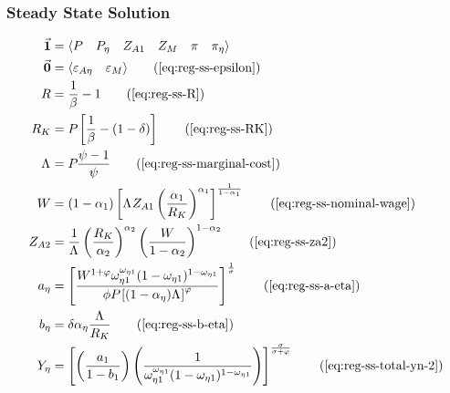 \documentclass[
thesis.tex
]{subfiles}
\begin{document}

	
	
	\subsubsection{Steady State Solution}
	
	\vspace*{-1cm}

	\begin{align}
		\vec{\bm{1}} &= \langle \begin{matrix} P & P_{\eta} & Z_{A1} & Z_{M} & \pi & \pi_{\eta} \end{matrix} \rangle \label{eq:reg-unity-vector}
		\\
		\vec{\bm{0}} &= \langle \begin{matrix} \varepsilon_{A\eta} & \varepsilon_{M} \end{matrix} \rangle \tag{\ref{eq:reg-ss-epsilon}}
		\\
		R &= \frac{1}{\beta} - 1 \tag{\ref{eq:reg-ss-R}}
		\\
		R_K &= P_{} \left[ \frac{1}{\beta} - (1-\delta) \right] \tag{\ref{eq:reg-ss-RK}}
		\\
		\Lambda_{} &= P_{} \frac{\psi-1}{\psi} \tag{\ref{eq:reg-ss-marginal-cost}}
		\\
		W &= (1-{\alpha_{1}}) \left[ \Lambda_{} Z_{A1} \left( \frac{{\alpha_{1}}}{R_K} \right)^{{\alpha_{1}}} \right]^\frac{1}{1-{\alpha_{1}}} \tag{\ref{eq:reg-ss-nominal-wage}}
		\\
		Z_{A2} &= \frac{1}{\Lambda_{}} \left( \frac{R_K}{{\alpha_{2}}} \right)^{{\alpha_{2}}} \left( \frac{W}{1-{\alpha_{2}}} \right)^{1-{\alpha_{2}}} \tag{\ref{eq:reg-ss-za2}}
		\\
		a_{\eta} &= \left[ \frac{W^{1 +\varphi} \omega_{\eta 1}^{\omega_{\eta 1}} (1 -\omega_{\eta 1})^{1 -\omega_{\eta 1}}}{\phi P_{} \left[ (1 -\alpha_{\eta}) \Lambda_{} \right]^{\varphi}} \right]^{\frac{1}{\sigma}} \tag{\ref{eq:reg-ss-a-eta}}
		\\
		b_{\eta} &= \delta {\alpha_{\eta}} \frac{\Lambda_{}}{R_K} \tag{\ref{eq:reg-ss-b-eta}}
		\\
		Y_{\eta} &= \left[ \left( \frac{a_{1}}{1 - b_{1}} \right) \left( \frac{1}{\omega_{\eta 1}^{\omega_{\eta 1}} (1 - \omega_{\eta 1})^{1 - \omega_{\eta 1}}} \right) \right]^{\frac{\sigma}{\sigma + \varphi}} \tag{\ref{eq:reg-ss-total-yn-2}}

\end{align}
\end{document}
